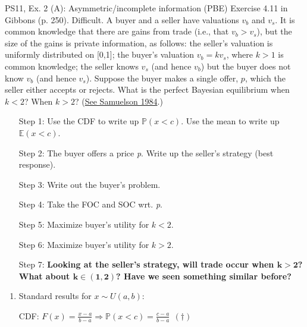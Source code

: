 \begin{frame}{PS11, Ex. 2 (A): Asymmetric/incomplete information (PBE)}
    Exercise 4.11 in Gibbons (p. 250). Difficult. A buyer and a seller have valuations $v_b$ and $v_s$. It is common knowledge that there are gains from trade (i.e., that $v_b > v_s$), but the size of the gains is private information, as follows: the seller’s valuation is uniformly distributed on [0,1]; the buyer’s valuation $v_b = kv_s$, where $k > 1$ is common knowledge; the seller knows $v_s$ (and hence $v_b$) but the buyer does not know $v_b$ (and hence $v_s$). Suppose the buyer makes a single offer, $p$, which the seller either accepts or rejects. What is the perfect Bayesian equilibrium when $k < 2$? When $k > 2$? (\href{https://www.jstor.org/stable/1911195}{See Samuelson 1984}.) \vspace{-8pt}
    \begin{multicols}{2}
      \begin{itemize}
        \item[Step 1:] Use the CDF to write up $\mathbb{P}(x<c)$. Use the mean to write up $\mathbb{E}(x<c)$.
        \item[Step 2:] \vspace{-2pt} The buyer offers a price \textit{p}. Write up the seller's strategy (best response).
        \item[Step 3:] \vspace{-2pt} Write out the buyer's problem.
        \item[Step 4:] \vspace{-2pt} Take the FOC and SOC wrt. \textit{p}.
        \item[Step 5:] \vspace{-2pt} Maximize buyer's utility for $k<2$.
        \item[Step 6:] \vspace{-2pt} Maximize buyer's utility for $k>2$.
        \item[Step 7:] \vspace{-2pt} \textbf{Looking at the seller's strategy, will trade occur when $\bm{k>2}$?\\
        What about $\bm{k\in(1,2)}$? Have we seen something similar before?}
      \end{itemize}
      \vfill\null\columnbreak
      \begin{enumerate}
        \item \vspace{-2pt} Standard results for $x\sim U(a, b):$
        \item[CDF:] \vspace{-2pt} $F(x)=\frac{x-a}{b-a}\Rightarrow\mathbb{P}(x<c)=\frac{c-a}{b-a}\ \ (\dagger)$

\end{enumerate}
\end{multicols}
\end{frame}
